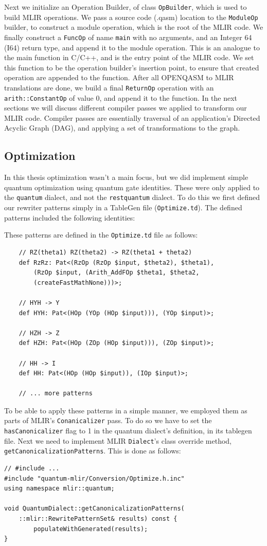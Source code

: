 Next we initialize an Operation Builder, of class \texttt{OpBuilder}, which is
used to build MLIR operations. We pass a source code (.qasm) location to the
\texttt{ModuleOp} builder, to construct a module operation, which is the root of
the MLIR code. We finally construct a \texttt{FuncOp} of name \texttt{main} with
no arguments, and an Integer 64 (I64) return type, and append it to the module
operation. This is an analogue to the main function in C/C++, and is the entry
point of the MLIR code. We set this function to be the operation builder's
insertion point, to ensure that created operation are appended to the function.
After all OPENQASM to MLIR translations are done, we build a final
\texttt{ReturnOp} operation with an \texttt{arith::ConstantOp} of value 0, and
append it to the function. In the next sections we will discuss different
compiler passes we applied to transform our MLIR code. Compiler passes are
essentially traversal of an application's Directed Acyclic Graph (DAG), and
applying a set of transformations to the graph.

\subsection{Optimization}
\label{sec:optimization}
In this thesis optimization wasn't a main focus, but we did implement simple
quantum optimization using quantum gate identities. These were only applied to
the \texttt{quantum} dialect, and not the \texttt{restquantum} dialect. To do
this we first defined our rewriter patterns simply in a TableGen file
(\texttt{Optimize.td}). The defined patterns included the following identities:

These patterns are defined in the \texttt{Optimize.td} file as follows:
\begin{verbatim}
    // RZ(theta1) RZ(theta2) -> RZ(theta1 + theta2) 
    def RzRz: Pat<(RzOp (RzOp $input, $theta2), $theta1), 
        (RzOp $input, (Arith_AddFOp $theta1, $theta2,
        (createFastMathNone)))>;

    // HYH -> Y 
    def HYH: Pat<(HOp (YOp (HOp $input))), (YOp $input)>;

    // HZH -> Z 
    def HZH: Pat<(HOp (ZOp (HOp $input))), (ZOp $input)>;

    // HH -> I 
    def HH: Pat<(HOp (HOp $input)), (IOp $input)>;

    // ... more patterns
\end{verbatim}
To be able to apply these patterns in a simple manner, we employed them as parts
of MLIR's \texttt{Conanicalizer} pass. To do so we have to set the
\texttt{hasCanonicalizer} flag to 1 in the quantum dialect's definition, in its
tablegen file. Next we need to implement MLIR \texttt{Dialect}'s class override
method, \texttt{getCanonicalizationPatterns}. This is done as follows:
\begin{verbatim}
// #include ... 
#include "quantum-mlir/Conversion/Optimize.h.inc" 
using namespace mlir::quantum;

void QuantumDialect::getCanonicalizationPatterns(
    ::mlir::RewritePatternSet& results) const { 
        populateWithGenerated(results); 
}
\end{verbatim}

